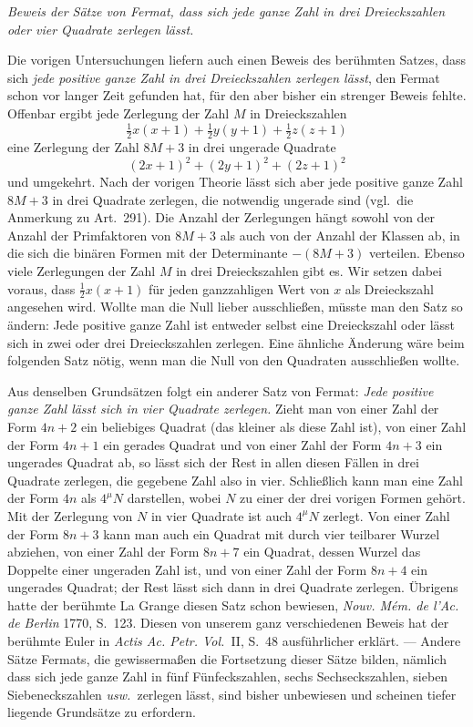 \begin{center}\textit{Beweis der Sätze von Fermat, dass sich jede ganze Zahl in drei Dreieckszahlen oder vier Quadrate zerlegen lässt.}\end{center}
Die vorigen Untersuchungen liefern auch einen Beweis des berühmten
Satzes, dass sich \textit{jede positive ganze Zahl in drei Dreieckszahlen
zerlegen lässt}, den Fermat schon vor langer Zeit gefunden hat,
für den aber bisher ein strenger Beweis fehlte. Offenbar ergibt
jede Zerlegung der Zahl \(M\) in Dreieckszahlen
\[
\tfrac12 x(x+1)+\tfrac12 y(y+1)+\tfrac12 z(z+1)
\]
eine Zerlegung der Zahl \(8M+3\) in drei ungerade Quadrate
\[
(2x+1)^2+(2y+1)^2+(2z+1)^2
\]
und umgekehrt. Nach der vorigen Theorie lässt sich aber jede positive
ganze Zahl \(8M+3\) in drei Quadrate zerlegen, die notwendig ungerade
sind (vgl.\ die Anmerkung zu Art.\ 291). Die Anzahl der Zerlegungen
hängt sowohl von der Anzahl der Primfaktoren von \(8M+3\) als auch
von der Anzahl der Klassen ab, in die sich die binären Formen mit
der Determinante \(-(8M+3)\) verteilen. Ebenso viele Zerlegungen der
Zahl \(M\) in drei Dreieckszahlen gibt es. Wir setzen dabei voraus,
dass \(\frac12 x(x+1)\) für jeden ganzzahligen Wert von \(x\) als Dreieckszahl
angesehen wird. Wollte man die Null lieber ausschließen, müsste
man den Satz so ändern: Jede positive ganze Zahl ist entweder selbst
eine Dreieckszahl oder lässt sich in zwei oder drei Dreieckszahlen
zerlegen. Eine ähnliche Änderung wäre beim folgenden Satz nötig,
wenn man die Null von den Quadraten ausschließen wollte.

Aus denselben Grundsätzen folgt ein anderer Satz von Fermat: \textit{Jede
positive ganze Zahl lässt sich in vier Quadrate zerlegen.} Zieht
man von einer Zahl der Form \(4n+2\) ein beliebiges Quadrat (das
kleiner als diese Zahl ist), von einer Zahl der Form
\(4n+1\) ein gerades Quadrat und von einer Zahl der Form \(4n+3\)
ein ungerades Quadrat ab, so lässt sich der Rest in allen diesen
Fällen in drei Quadrate zerlegen, die gegebene Zahl also in vier.
Schließlich kann man eine Zahl der Form \(4n\) als \(4^{\mu}N\) darstellen,
wobei \(N\) zu einer der drei vorigen Formen gehört. Mit der
Zerlegung von \(N\) in vier Quadrate ist auch \(4^{\mu}N\) zerlegt.
Von einer Zahl der Form \(8n+3\) kann man auch ein Quadrat mit
durch vier teilbarer Wurzel abziehen, von einer Zahl der Form
\(8n+7\) ein Quadrat, dessen Wurzel das Doppelte einer ungeraden
Zahl ist, und von einer Zahl der Form \(8n+4\) ein ungerades Quadrat;
der Rest lässt sich dann in drei Quadrate zerlegen. Übrigens hatte
der berühmte La Grange diesen Satz schon bewiesen, \textit{Nouv.
Mém. de l'Ac. de Berlin} 1770, S.\ 123. Diesen von unserem ganz
verschiedenen Beweis hat der berühmte Euler in \textit{Actis Ac.
Petr. Vol.}\ II, S.\ 48 ausführlicher erklärt. --- Andere Sätze
Fermats, die gewissermaßen die Fortsetzung dieser Sätze bilden,
nämlich dass sich jede ganze Zahl in fünf Fünfeckszahlen, sechs
Sechseckszahlen, sieben Siebeneckszahlen \textit{usw.}\ zerlegen
lässt, sind bisher unbewiesen und scheinen tiefer liegende Grundsätze
zu erfordern.
